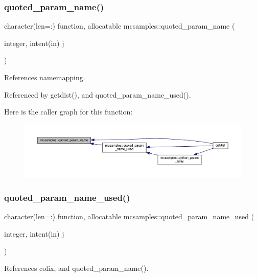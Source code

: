 \subsubsection{\texorpdfstring{quoted\+\_\+param\+\_\+name()}{quoted\_param\_name()}}
{\footnotesize\ttfamily character(len=\+:) function, allocatable mcsamples\+::quoted\+\_\+param\+\_\+name (\begin{DoxyParamCaption}\item[{integer, intent(in)}]{j }\end{DoxyParamCaption})}



References namemapping.



Referenced by getdist(), and quoted\+\_\+param\+\_\+name\+\_\+used().

Here is the caller graph for this function\+:
\nopagebreak
\begin{figure}[H]
\begin{center}
\leavevmode
\includegraphics[width=350pt]{namespacemcsamples_a1084f1fea1eddc1385237c666e34115b_icgraph}
\end{center}
\end{figure}
\mbox{\label{namespacemcsamples_aaed4d229224d51b97154b233f072fae9}} 
\subsubsection{\texorpdfstring{quoted\+\_\+param\+\_\+name\+\_\+used()}{quoted\_param\_name\_used()}}
{\footnotesize\ttfamily character(len=\+:) function, allocatable mcsamples\+::quoted\+\_\+param\+\_\+name\+\_\+used (\begin{DoxyParamCaption}\item[{integer, intent(in)}]{j }\end{DoxyParamCaption})}



References colix, and quoted\+\_\+param\+\_\+name().



